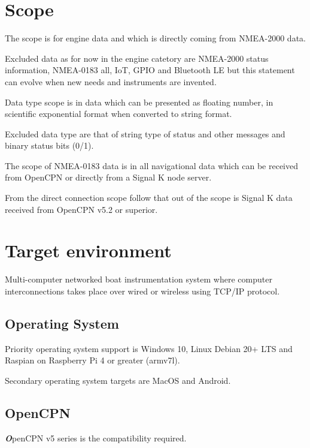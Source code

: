 \documentclass[11pt]{article}
\begin{document}
    \hypertarget{scope}{%
\section{Scope}\label{scope}}

    The scope is for engine data and which is directly coming from NMEA-2000
data.

Excluded data as for now in the engine catetory are NMEA-2000 status
information, NMEA-0183 all, IoT, GPIO and Bluetooth LE but this
statement can evolve when new needs and instruments are invented.

Data type scope is in data which can be presented as floating number, in
scientific exponential format when converted to string format.

Excluded data type are that of string type of status and other messages
and binary status bits (0/1).

The scope of NMEA-0183 data is in all navigational data which can be
received from OpenCPN or directly from a Signal K node server.

From the direct connection scope follow that out of the scope is Signal
K data received from OpenCPN v5.2 or superior.

    \hypertarget{target-environment}{%
\section{Target environment}\label{target-environment}}

    Multi-computer networked boat instrumentation system where computer
interconnections takes place over wired or wireless using TCP/IP
protocol.

    \hypertarget{operating-system}{%
\subsection{Operating System}\label{operating-system}}

    Priority operating system support is Windows 10, Linux Debian 20+ LTS
and Raspian on Raspberry Pi 4 or greater (armv7l).

    Secondary operating system targets are MacOS and Android.

    \hypertarget{opencpn}{%
\subsection{OpenCPN}\label{opencpn}}

    \textbf{\emph{O}}penCPN v5 series is the compatibility required.
\end{document}
